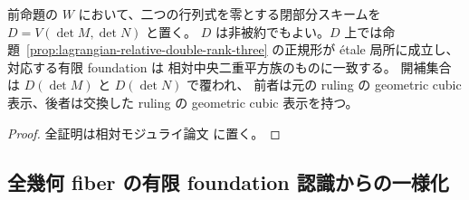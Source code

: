 \begin{corollary}
\label{cor:lagrangian-open-closed-recognition}
前命題の $W$ において、二つの行列式を零とする閉部分スキームを
$D=V(\det M,\det N)$ と置く。
$D$ は非被約でもよい。$D$ 上では命題~\ref{prop:lagrangian-relative-double-rank-three} の正規形が
\texorpdfstring{\'etale}{etale} 局所に成立し、対応する有限 foundation は
相対中央二重平方族のものに一致する。
開補集合は $D(\det M)$ と $D(\det N)$ で覆われ、
前者は元の ruling の geometric cubic 表示、後者は交換した ruling の
geometric cubic 表示を持つ。
\end{corollary}
\begin{proof}
全証明は相対モジュライ論文 \cite[noncubic有限型効果性]{QuadricModuli2026} に置く。
\end{proof}

\subsection{全幾何 fiber の有限 foundation 認識からの一様化}

